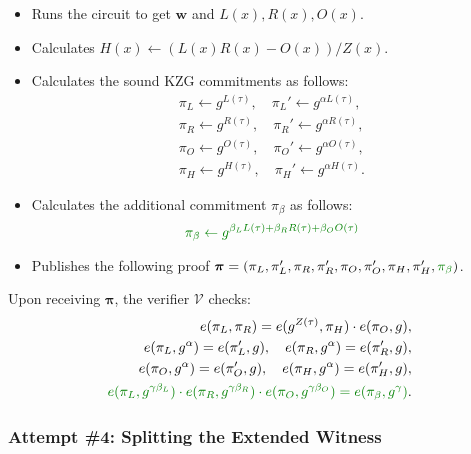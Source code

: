 \documentclass[../lecture-notes.tex]{subfiles}
\begin{document}
\begin{tcolorbox}
\begin{itemize}[label=]
        \item Runs the circuit to get $\mathbf{w}$ and $L(x),R(x),O(x)$.
        \item Calculates $H(x) \gets (L(x)R(x) - O(x))\big/ Z(x)$.
        \item Calculates the sound KZG commitments as follows: 
        \begin{align*}
            \pi_L \gets g^{L(\tau)}, \quad \pi_L' \gets g^{\alpha L(\tau)}, \\
            \pi_R \gets g^{R(\tau)}, \quad \pi_R' \gets g^{\alpha R(\tau)}, \\
            \pi_O \gets g^{O(\tau)}, \quad \pi_O' \gets g^{\alpha O(\tau)}, \\
            \pi_H \gets g^{H(\tau)}, \quad \pi_H' \gets g^{\alpha H(\tau)}.
        \end{align*}
        \item \textcolor{green!50!black}{Calculates the additional commitment $\pi_{\beta}$ as follows:}
        \begin{equation*}
            \textcolor{green!50!black}{\pi_{\beta} \gets g^{\beta_LL(\tau) + \beta_RR(\tau) + \beta_OO(\tau)}}
        \end{equation*}
        \item Publishes the following proof $\boldsymbol{\pi} = (\pi_L,\pi_L',\pi_R,\pi_R',\pi_O,\pi_O',\pi_H,\pi_H',\textcolor{green!50!black}{\pi_{\beta}})$.
    \end{itemize}

    Upon receiving $\boldsymbol{\pi}$, the verifier $\mathcal{V}$ checks:
    \begin{align*}
        e(\pi_L, \pi_R) = e(g^{Z(\tau)}, \pi_H) \cdot e(\pi_O, g), \\
        e(\pi_L, g^{\alpha}) = e(\pi_L', g), \quad e(\pi_R, g^{\alpha}) = e(\pi_R', g), \\
        e(\pi_O, g^{\alpha}) = e(\pi_O', g), \quad e(\pi_H, g^{\alpha}) = e(\pi_H', g), \\
        \textcolor{green!50!black}{e(\pi_L, g^{\gamma\beta_L}) \cdot e(\pi_R, g^{\gamma\beta_R}) \cdot e(\pi_O, g^{\gamma\beta_O}) = e(\pi_{\beta}, g^{\gamma})}.
    \end{align*}
\end{tcolorbox}

\subsubsection{Attempt \#4: Splitting the Extended Witness}
\end{document}
